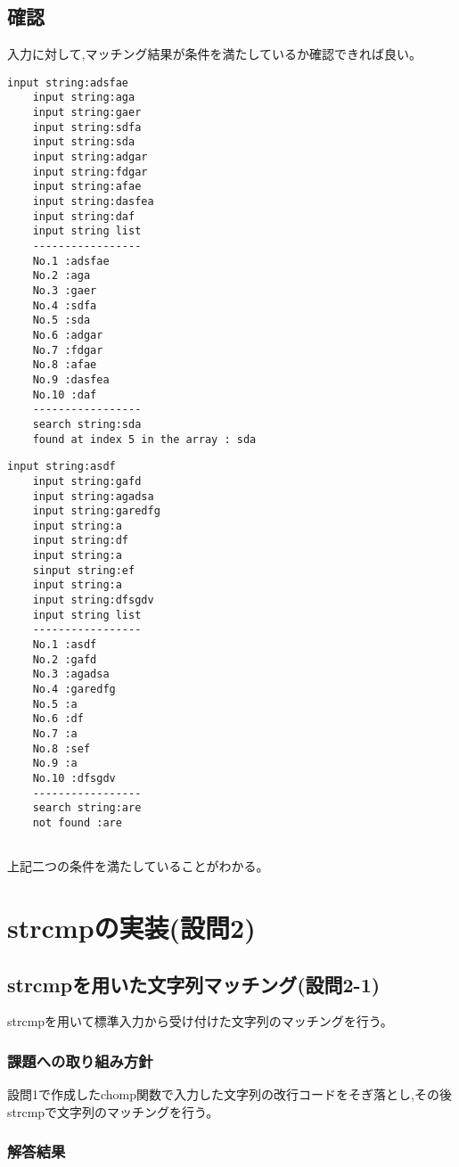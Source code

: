 \documentclass[fontsize = 10pt, paper= a4,twocolumn,column_gap=3zw]{jlreq}
\begin{document}
\subsection{確認}
入力に対して,マッチング結果が条件を満たしているか確認できれば良い。
\begin{lstlisting}[basicstyle=\ttfamily\footnotesize, frame=single, caption=test1,label=test1]
    input string:adsfae
    input string:aga
    input string:gaer
    input string:sdfa
    input string:sda
    input string:adgar
    input string:fdgar
    input string:afae
    input string:dasfea
    input string:daf
    input string list
    -----------------
    No.1 :adsfae
    No.2 :aga
    No.3 :gaer
    No.4 :sdfa
    No.5 :sda
    No.6 :adgar
    No.7 :fdgar
    No.8 :afae
    No.9 :dasfea
    No.10 :daf
    -----------------
    search string:sda
    found at index 5 in the array : sda 
\end{lstlisting}

\begin{lstlisting}[basicstyle=\ttfamily\footnotesize, frame=single, caption=test2,label=test2]
    input string:asdf
    input string:gafd
    input string:agadsa
    input string:garedfg
    input string:a
    input string:df
    input string:a
    sinput string:ef
    input string:a
    input string:dfsgdv
    input string list
    -----------------
    No.1 :asdf
    No.2 :gafd
    No.3 :agadsa
    No.4 :garedfg
    No.5 :a
    No.6 :df
    No.7 :a
    No.8 :sef
    No.9 :a
    No.10 :dfsgdv
    -----------------
    search string:are
    not found :are
    
\end{lstlisting}

上記二つの条件を満たしていることがわかる。

\section{strcmpの実装(設問2)}
\subsection{strcmpを用いた文字列マッチング(設問2-1)}
strcmpを用いて標準入力から受け付けた文字列のマッチングを行う。
\subsubsection{課題への取り組み方針}
設問1で作成したchomp関数で入力した文字列の改行コードをそぎ落とし,その後strcmpで文字列のマッチングを行う。
\subsubsection{解答結果}
\end{document}
